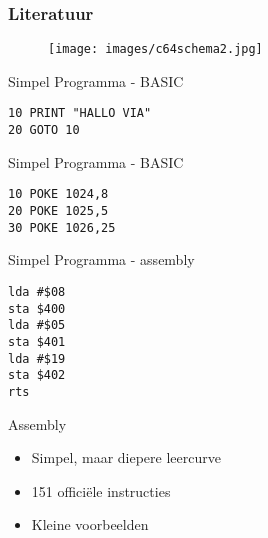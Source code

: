 \documentclass[aspectratio=43]{uva-inf-presentation}
\begin{document}

\begin{frame}
\frametitle{Literatuur}

\begin{figure}
\texttt{[image: images/c64schema2.jpg]}
\end{figure}

\end{frame}


\begin{frame}[fragile]{Simpel Programma - BASIC}

\begin{lstlisting}
10 PRINT "HALLO VIA"
20 GOTO 10
\end{lstlisting}

\end{frame}


\begin{frame}[fragile]{Simpel Programma - BASIC}

\begin{lstlisting}
10 POKE 1024,8
20 POKE 1025,5
30 POKE 1026,25
\end{lstlisting}

\end{frame}


\begin{frame}[fragile]{Simpel Programma - assembly}

\begin{lstlisting}
lda #$08
sta $400
lda #$05
sta $401
lda #$19
sta $402
rts
\end{lstlisting}

\end{frame}


\begin{frame}{Assembly}

\begin{itemize}
\item Simpel, maar diepere leercurve
\item 151 offici\"ele instructies
\item Kleine voorbeelden
\end{itemize}

\end{frame}
\end{document}
